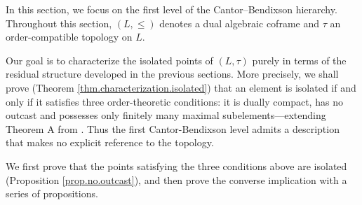 \documentclass{article}
\newtheorem{theorem}{Theorem}[section]
\begin{document}
In this section, we focus on the first level of the Cantor--Bendixson hierarchy. Throughout this section, \((L,\leq)\) denotes a dual algebraic coframe and \(\tau\) an order-compatible topology on \(L\).


Our goal is to characterize the isolated points of \((L,\tau)\) purely in terms of the residual structure developed in the previous sections. More precisely, we shall prove (Theorem \ref{thm.characterization.isolated}) that an element is isolated if and only if it satisfies {three} %
order-theoretic conditions: it is dually compact, has no outcast and possesses only finitely many maximal subelements---extending Theorem A from \cite{GN25}. Thus the first Cantor-Bendixson level admits a description that makes no explicit reference to the topology.

{
We first prove that the points satisfying the {three} conditions above are isolated (Proposition \ref{prop.no.outcast}), and then prove the converse implication with a series of propositions.
}


\end{document}
